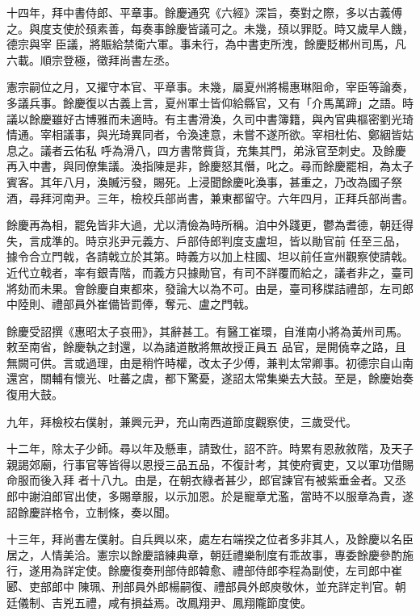 \begin{pinyinscope}
 十四年，拜中書侍郎、平章事。餘慶通究《六經》深旨，奏對之際，多以古義傅之。與度支使於䪹素善，每奏事餘慶皆議可之。未幾，䪹以罪貶。時又歲旱人饑，德宗與宰
 臣議，將賑給禁衛六軍。事未行，為中書吏所洩，餘慶貶郴州司馬，凡六載。順宗登極，徵拜尚書左丞。



 憲宗嗣位之月，又擢守本官、平章事。未幾，屬夏州將楊惠琳阻命，宰臣等論奏，多議兵事。餘慶復以古義上言，夏州軍士皆仰給縣官，又有「介馬萬蹄」之語。時議以餘慶雖好古博雅而未適時。有主書滑渙，久司中書簿籍，與內官典樞密劉光琦情通。宰相議事，與光琦異同者，令渙達意，未嘗不遂所欲。宰相杜佑、鄭絪皆姑息之。議者云佑私
 呼為滑八，四方書幣貲貨，充集其門，弟泳官至刺史。及餘慶再入中書，與同僚集議。渙指陳是非，餘慶怒其僭，叱之。尋而餘慶罷相，為太子賓客。其年八月，渙贓污發，賜死。上浸聞餘慶叱渙事，甚重之，乃改為國子祭酒，尋拜河南尹。三年，檢校兵部尚書，兼東都留守。六年四月，正拜兵部尚書。



 餘慶再為相，罷免皆非大過，尤以清儉為時所稱。洎中外踐更，鬱為耆德，朝廷得失，言成準的。時京兆尹元義方、戶部侍郎判度支盧坦，皆以勛官前
 任至三品，據令合立門戟，各請戟立於其第。時義方以加上柱國、坦以前任宣州觀察使請戟。近代立戟者，率有銀青階，而義方只據勛官，有司不詳覆而給之，議者非之，臺司將劾而未果。會餘慶自東都來，發論大以為不可。由是，臺司移牒詰禮部，左司郎中陸則、禮部員外崔備皆罰俸，奪元、盧之門戟。



 餘慶受詔撰《惠昭太子哀冊》，其辭甚工。有醫工崔環，自淮南小將為黃州司馬。敕至南省，餘慶執之封還，以為諸道散將無故授正員五
 品官，是開僥幸之路，且無闕可供。言或過理，由是稍忤時權，改太子少傅，兼判太常卿事。初德宗自山南還宮，關輔有懷光、吐蕃之虞，都下驚憂，遂詔太常集樂去大鼓。至是，餘慶始奏復用大鼓。



 九年，拜檢校右僕射，兼興元尹，充山南西道節度觀察使，三歲受代。



 十二年，除太子少師。尋以年及懸車，請致仕，詔不許。時累有恩赦敘階，及天子親謁郊廟，行事官等皆得以恩授三品五品，不復計考，其使府賓吏，又以軍功借賜命服而後入拜
 者十八九。由是，在朝衣綠者甚少，郎官諫官有被紫垂金者。又丞郎中謝洎郎官出使，多賜章服，以示加恩。於是寵章尤濫，當時不以服章為貴，遂詔餘慶詳格令，立制條，奏以聞。



 十三年，拜尚書左僕射。自兵興以來，處左右端揆之位者多非其人，及餘慶以名臣居之，人情美洽。憲宗以餘慶諳練典章，朝廷禮樂制度有乖故事，專委餘慶參酌施行，遂用為詳定使。餘慶復奏刑部侍郎韓愈、禮部侍郎李程為副使，左司郎中崔郾、吏部郎中
 陳珮、刑部員外郎楊嗣復、禮部員外郎庾敬休，並充詳定判官。朝廷儀制、吉兇五禮，咸有損益焉。改鳳翔尹、鳳翔隴節度使。




\end{pinyinscope}
